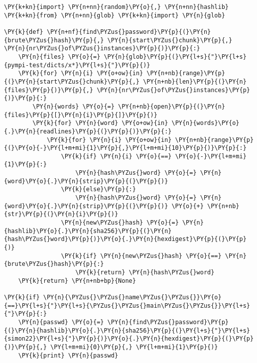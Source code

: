 \begin{Verbatim}[commandchars=\\\{\}]
\PY{k+kn}{import} \PY{n+nn}{random}\PY{o}{,} \PY{n+nn}{hashlib}
\PY{k+kn}{from} \PY{n+nn}{glob} \PY{k+kn}{import} \PY{n}{glob}

\PY{k}{def} \PY{n+nf}{find\PYZus{}password}\PY{p}{(}\PY{n}{brute\PYZus{}hash}\PY{p}{,} \PY{n}{start\PYZus{}chunk}\PY{p}{,} \PY{n}{nr\PYZus{}of\PYZus{}instances}\PY{p}{)}\PY{p}{:}
	\PY{n}{files} \PY{o}{=} \PY{n}{glob}\PY{p}{(}\PY{l+s}{"}\PY{l+s}{pympi-test/dicts/x*}\PY{l+s}{"}\PY{p}{)}
	\PY{k}{for} \PY{n}{i} \PY{o+ow}{in} \PY{n+nb}{range}\PY{p}{(}\PY{n}{start\PYZus{}chunk}\PY{p}{,} \PY{n+nb}{len}\PY{p}{(}\PY{n}{files}\PY{p}{)}\PY{p}{,} \PY{n}{nr\PYZus{}of\PYZus{}instances}\PY{p}{)}\PY{p}{:} 
		\PY{n}{words} \PY{o}{=} \PY{n+nb}{open}\PY{p}{(}\PY{n}{files}\PY{p}{[}\PY{n}{i}\PY{p}{]}\PY{p}{)}
		\PY{k}{for} \PY{n}{word} \PY{o+ow}{in} \PY{n}{words}\PY{o}{.}\PY{n}{readlines}\PY{p}{(}\PY{p}{)}\PY{p}{:}
			\PY{k}{for} \PY{n}{i} \PY{o+ow}{in} \PY{n+nb}{range}\PY{p}{(}\PY{o}{-}\PY{l+m+mi}{1}\PY{p}{,}\PY{l+m+mi}{10}\PY{p}{)}\PY{p}{:}
				\PY{k}{if} \PY{n}{i} \PY{o}{==} \PY{o}{-}\PY{l+m+mi}{1}\PY{p}{:}
					\PY{n}{hash\PYZus{}word} \PY{o}{=} \PY{n}{word}\PY{o}{.}\PY{n}{strip}\PY{p}{(}\PY{p}{)}
				\PY{k}{else}\PY{p}{:}
					\PY{n}{hash\PYZus{}word} \PY{o}{=} \PY{n}{word}\PY{o}{.}\PY{n}{strip}\PY{p}{(}\PY{p}{)} \PY{o}{+} \PY{n+nb}{str}\PY{p}{(}\PY{n}{i}\PY{p}{)}
				\PY{n}{new\PYZus{}hash} \PY{o}{=} \PY{n}{hashlib}\PY{o}{.}\PY{n}{sha256}\PY{p}{(}\PY{n}{hash\PYZus{}word}\PY{p}{)}\PY{o}{.}\PY{n}{hexdigest}\PY{p}{(}\PY{p}{)}
				\PY{k}{if} \PY{n}{new\PYZus{}hash} \PY{o}{==} \PY{n}{brute\PYZus{}hash}\PY{p}{:}
					\PY{k}{return} \PY{n}{hash\PYZus{}word}
	\PY{k}{return} \PY{n+nb+bp}{None}

\PY{k}{if} \PY{n}{\PYZus{}\PYZus{}name\PYZus{}\PYZus{}}\PY{o}{==}\PY{l+s}{"}\PY{l+s}{\PYZus{}\PYZus{}main\PYZus{}\PYZus{}}\PY{l+s}{"}\PY{p}{:}
	\PY{n}{passwd} \PY{o}{=} \PY{n}{find\PYZus{}password}\PY{p}{(}\PY{n}{hashlib}\PY{o}{.}\PY{n}{sha256}\PY{p}{(}\PY{l+s}{"}\PY{l+s}{simon22}\PY{l+s}{"}\PY{p}{)}\PY{o}{.}\PY{n}{hexdigest}\PY{p}{(}\PY{p}{)}\PY{p}{,} \PY{l+m+mi}{0}\PY{p}{,} \PY{l+m+mi}{1}\PY{p}{)}
	\PY{k}{print} \PY{n}{passwd}
\end{Verbatim}
